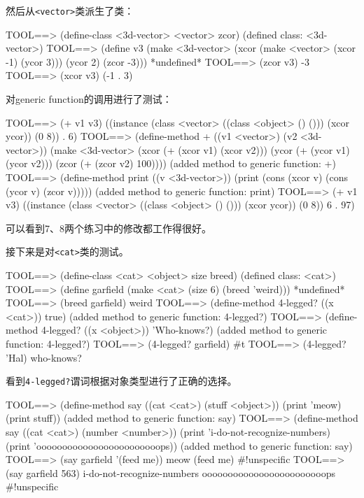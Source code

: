 \documentclass[a4paper]{article}
\newcommand{\code}[1]{\mbox{\tt #1}}
\begin{document}
然后从\code{<vector>}类派生了\code{<3d-vector>}类：

\beginlisp
TOOL==> (define-class <3d-vector> <vector> zcor)
(defined class: <3d-vector>)
\null
TOOL==> (define v3
          (make <3d-vector>
                (xcor (make <vector> (xcor -1) (ycor 3)))
                (ycor 2)
                (zcor -3)))
*undefined*
\null
TOOL==> (zcor v3)
-3
\null
TOOL==> (xcor v3)
(-1 . 3)
\null
\endlisp

对generic function的调用进行了测试：

\beginlisp
\null
TOOL==> (+ v1 v3)
((instance (class <vector> ((class <object> () ())) (xcor ycor)) (0 8)) . 6)
\null
TOOL==> (define-method + ((v1 <vector>) (v2 <3d-vector>))
          (make <3d-vector>
                (xcor (+ (xcor v1) (xcor v2)))
                (ycor (+ (ycor v1) (ycor v2)))
                (zcor (+ (zcor v2) 100))))
(added method to generic function: +)
\null
TOOL==> (define-method print ((v <3d-vector>))
          (print (cons (xcor v) (cons (ycor v) (zcor v)))))
(added method to generic function: print)
\null
TOOL==> (+ v1 v3)
((instance (class <vector> ((class <object> () ())) (xcor ycor)) (0 8)) 6 . 97)
\null
\endlisp

可以看到7、8两个练习中的修改都工作得很好。

接下来是对\code{<cat>}类的测试。

\beginlisp
TOOL==> (define-class <cat> <object> size breed)
(defined class: <cat>)
\null
TOOL==> (define garfield (make <cat> (size 6) (breed 'weird)))
*undefined*
\null
TOOL==> (breed garfield)
weird
\null
TOOL==> (define-method 4-legged? ((x <cat>)) true)
(added method to generic function: 4-legged?)
\null
TOOL==> (define-method 4-legged? ((x <object>)) 'Who-knows?)
(added method to generic function: 4-legged?)
\null
TOOL==> (4-legged? garfield)           
\#t
\null
TOOL==> (4-legged? 'Hal)
who-knows?
\null
\endlisp

看到\code{4-legged?}谓词根据对象类型进行了正确的选择。

\beginlisp
TOOL==> (define-method say ((cat <cat>) (stuff <object>))
  (print 'meow)
  (print stuff))
(added method to generic function: say)
\null
TOOL==> (define-method say ((cat <cat>) (number <number>))
  (print 'i-do-not-recognize-numbers)
  (print 'oooooooooooooooooooooooops))
(added method to generic function: say)
\null
TOOL==> (say garfield '(feed me))
meow
(feed me)
\#!unspecific
\null
TOOL==> (say garfield 563)
i-do-not-recognize-numbers
oooooooooooooooooooooooops
\#!unspecific
\null
\endlisp
\end{document}
